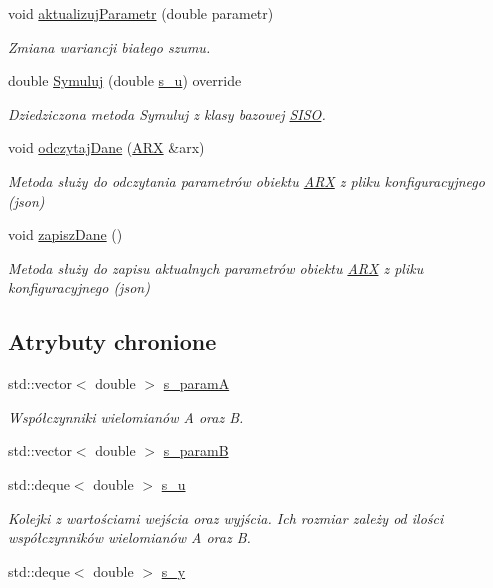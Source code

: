 \begin{DoxyCompactItemize}
void \hyperlink{class_a_r_x_a6353c1891e1b8ad9fa62ec14536caaa1}{aktualizuj\-Parametr} (double parametr)
\begin{DoxyCompactList}\small\item\em Zmiana wariancji białego szumu. \end{DoxyCompactList}\item 
double \hyperlink{class_a_r_x_aa2ee25b5f56aa74bda0323f61cef3c27}{Symuluj} (double \hyperlink{class_a_r_x_af61ad06d76ce7b19daa55ee0f59639e7}{s\-\_\-u}) override
\begin{DoxyCompactList}\small\item\em Dziedziczona metoda Symuluj z klasy bazowej \hyperlink{class_s_i_s_o}{S\-I\-S\-O}. \end{DoxyCompactList}\item 
void \hyperlink{class_a_r_x_a507465138d27f9beda85b7b94101e94b}{odczytaj\-Dane} (\hyperlink{class_a_r_x}{A\-R\-X} \&arx)
\begin{DoxyCompactList}\small\item\em Metoda służy do odczytania parametrów obiektu \hyperlink{class_a_r_x}{A\-R\-X} z pliku konfiguracyjnego (json) \end{DoxyCompactList}\item 
void \hyperlink{class_a_r_x_a555a9b18a1acbbb9f17fcf478d0a6b35}{zapisz\-Dane} ()
\begin{DoxyCompactList}\small\item\em Metoda służy do zapisu aktualnych parametrów obiektu \hyperlink{class_a_r_x}{A\-R\-X} z pliku konfiguracyjnego (json) \end{DoxyCompactList}\end{DoxyCompactItemize}
\subsection*{Atrybuty chronione}
\begin{DoxyCompactItemize}
\item 
std\-::vector$<$ double $>$ \hyperlink{class_a_r_x_a6f9a9743a50d912f9e8547a433b2baea}{s\-\_\-param\-A}
\begin{DoxyCompactList}\small\item\em Współczynniki wielomianów A oraz B. \end{DoxyCompactList}\item 
std\-::vector$<$ double $>$ \hyperlink{class_a_r_x_a57104d29d3cdd002f814d3460a9be2df}{s\-\_\-param\-B}
\item 
std\-::deque$<$ double $>$ \hyperlink{class_a_r_x_af61ad06d76ce7b19daa55ee0f59639e7}{s\-\_\-u}
\begin{DoxyCompactList}\small\item\em Kolejki z wartościami wejścia oraz wyjścia. Ich rozmiar zależy od ilości współczynników wielomianów A oraz B. \end{DoxyCompactList}\item 
std\-::deque$<$ double $>$ \hyperlink{class_a_r_x_aaeb3515374c95f4b7ed58c9676d89639}{s\-\_\-y}
\end{DoxyCompactItemize}
